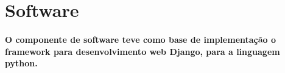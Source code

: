\section{Software}
\label{Sec:5-software}
\paragraph{
O componente de software teve como base de implementação o framework para desenvolvimento web Django, para a linguagem python.
}